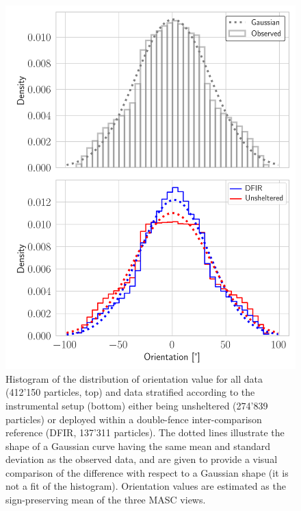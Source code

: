 \documentclass[draft]{agujournal2019}
\begin{document}
\begin{figure}
 \noindent \centering \includegraphics[width=\textwidth]{Fig03.png}
\caption{Histogram of the distribution of orientation value for all data (412'150 particles, top) and data stratified according to the instrumental setup (bottom) either being unsheltered (274'839 particles) or deployed within a double-fence inter-comparison reference (DFIR, 137'311 particles). The dotted lines illustrate the shape of a Gaussian curve having the same mean and standard deviation as the observed data, and are given to provide a visual comparison of the difference with respect to a Gaussian shape (it is not a fit of the histogram). Orientation values are estimated as the sign-preserving mean of the three MASC views.   }
\label{fig:alldata}
\end{figure}
 
\end{document}
